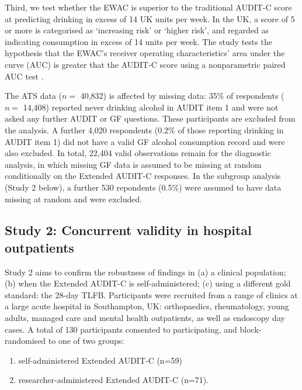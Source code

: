 \documentclass[]{article}
\providecommand{\tightlist}{%
  \setlength{\itemsep}{0pt}\setlength{\parskip}{0pt}}
\begin{document}
Third, we test whether the EWAC is superior to the traditional AUDIT-C
score at predicting drinking in excess of 14 UK units per week. In the
UK, a score of 5 or more is categorised as `increasing risk' or `higher
risk', and regarded as indicating consumption in excess of 14 units per
week. The study tests the hypothesis that the EWAC's receiver operating
characteristics' area under the curve (AUC) is greater that the AUDIT-C
score using a nonparametric paired AUC test \citep{Delong1988}.

The ATS data (\(n=\) 40,832) is affected by missing data: 35\% of
respondents (\(n=\) 14,408) reported never drinking alcohol in AUDIT
item 1 and were not asked any further AUDIT or GF questions. These
participants are excluded from the analysis. A further 4,020 respondents
(0.2\% of those reporting drinking in AUDIT item 1) did not have a valid
GF alcohol consumption record and were also excluded. In total, 22,404
valid observations remain for the diagnostic analysis, in which missing
GF data is assumed to be missing at random conditionally on the Extended
AUDIT-C responses. In the subgroup analysis (Study 2 below), a further
530 repondents (0.5\%) were assumed to have data missing at random and
were excluded.

\hypertarget{study-2-concurrent-validity-in-hospital-outpatients}{%
\subsection{Study 2: Concurrent validity in hospital
outpatients}\label{study-2-concurrent-validity-in-hospital-outpatients}}

Study 2 aims to confirm the robustness of findings in (a) a clinical
population; (b) when the Extended AUDIT-C is self-administered; (c)
using a different gold standard: the 28-day TLFB. Participants were
recruited from a range of clinics at a large acute hospital in
Southampton, UK: orthopaedics, rheumatology, young adults, managed care
and mental health outpatients, as well as endoscopy day cases. A total
of 130 participants consented to participating, and block-randomised to
one of two groups:

\begin{enumerate}
\def\labelenumi{(\arabic{enumi})}
\tightlist
\item
  self-administered Extended AUDIT-C (n=59)
\item
  researcher-administered Extended AUDIT-C (n=71).
\end{enumerate}
\end{document}
